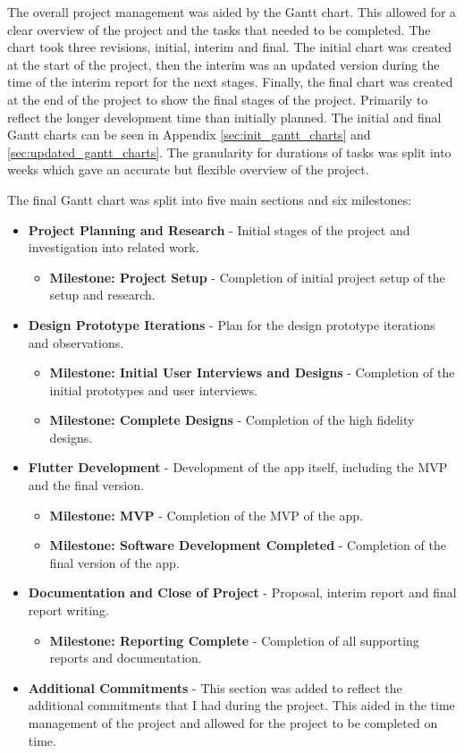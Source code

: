 \documentclass [11pt,a4paper]{article}
\begin{document}
The overall project management was aided by the Gantt chart. This allowed for a clear overview of the project and the tasks that needed to be completed. The chart took three revisions, initial, interim and final. The initial chart was created at the start of the project, then the interim was an updated version during the time of the interim report for the next stages. Finally, the final chart was created at the end of the project to show the final stages of the project. Primarily to reflect the longer development time than initially planned. The initial and final Gantt charts can be seen in Appendix \ref{sec:init_gantt_charts} and \ref{sec:updated_gantt_charts}. The granularity for durations of tasks was split into weeks which gave an accurate but flexible overview of the project.

The final Gantt chart was split into five main sections and six milestones:
\begin{itemize}[noitemsep]
    \item \textbf{Project Planning and Research} - Initial stages of the project and investigation into related work.
    \begin{itemize}[noitemsep]
        \item \textbf{Milestone: Project Setup} - Completion of initial project setup of the setup and research.
    \end{itemize}
    \item \textbf{Design Prototype Iterations} - Plan for the design prototype iterations and observations.
    \begin{itemize}[noitemsep]
        \item \textbf{Milestone: Initial User Interviews and Designs} - Completion of the initial prototypes and user interviews.
        \item \textbf{Milestone: Complete Designs} - Completion of the high fidelity designs.
    \end{itemize}
    \item \textbf{Flutter Development} - Development of the app itself, including the MVP and the final version.
    \begin{itemize}[noitemsep]
        \item \textbf{Milestone: MVP} - Completion of the MVP of the app.
        \item \textbf{Milestone: Software Development Completed} - Completion of the final version of the app.
    \end{itemize}
    \item \textbf{Documentation and Close of Project} - Proposal, interim report and final report writing. 
    \begin{itemize}
        \item \textbf{Milestone: Reporting Complete} - Completion of all supporting reports and documentation.
    \end{itemize}
    \item \textbf{Additional Commitments} - This section was added to reflect the additional commitments that I had during the project. This aided in the time management of the project and allowed for the project to be completed on time.
\end{itemize}
\end{document}
